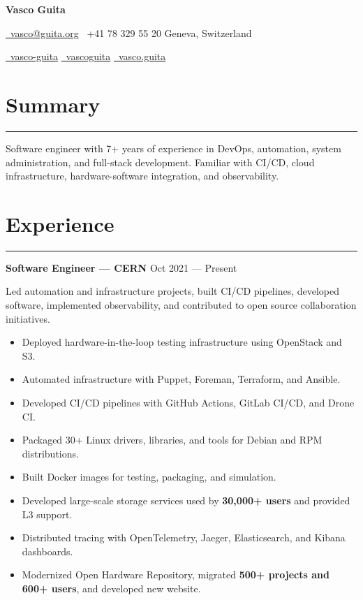 \documentclass[11pt,a4paper]{article}
\begin{document}
\begin{center}
  {\huge \textbf{Vasco Guita}}

  \bigskip

  \href{mailto:vasco@guita.org}{\faAt\ vasco@guita.org}
  \quad
  \faPhone\ +41 78 329 55 20
  \quad
  \faMapMarker* Geneva, Switzerland

  \href{https://www.linkedin.com/in/vasco-guita}{\faLinkedin\ vasco-guita}
  \quad
  \href{https://github.com/vascoguita}{\faGithub\ vascoguita}
  \quad
  \href{https://gitlab.com/vasco.guita}{\faGitlab\ vasco.guita}
\end{center}

\bigskip

\section*{Summary}

\hrule

Software engineer with 7+ years of experience in DevOps, automation, system
administration, and full-stack development. Familiar with CI/CD, cloud
infrastructure, hardware-software integration, and observability.

\section*{Experience}

\hrule

\textbf{Software Engineer --- CERN}
\hfill
Oct 2021 --- Present

Led automation and infrastructure projects, built CI/CD pipelines, developed
software, implemented observability, and contributed to open source
collaboration initiatives.

\begin{itemize}[noitemsep]
  \item Deployed hardware-in-the-loop testing infrastructure using OpenStack and
  S3.
  \item Automated infrastructure with Puppet, Foreman, Terraform, and Ansible.
  \item Developed CI/CD pipelines with GitHub Actions, GitLab CI/CD, and Drone
  CI\@.
  \item Packaged 30+ Linux drivers, libraries, and tools for Debian and RPM
  distributions.
  \item Built Docker images for testing, packaging, and simulation.
  \item Developed large-scale storage services used by \textbf{30,000+ users}
  and provided L3 support.
  \item Distributed tracing with OpenTelemetry, Jaeger, Elasticsearch, and
  Kibana dashboards.
  \item Modernized Open Hardware Repository, migrated
  \textbf{500+ projects and 600+ users}, and developed new website.
\end{itemize}
\end{document}
